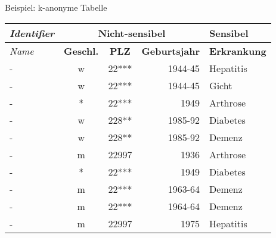 \begin{frame}{Beispiel: k-anonyme Tabelle}
	\begin{center}
		\begin{tabular}{|l|c|c|r|l|}
		\hline \textit{Identifier} & \multicolumn{3}{c|}{\textbf{Nicht-sensibel}} & \textbf{Sensibel} \\ 
		\hline \textit{Name} & \textbf{Geschl.} & \textbf{PLZ} & \textbf{Geburtsjahr} & \textbf{Erkrankung} \\ \hline
		\hline \rowcolor{svshellblau1!30} - & w & 22*** & 1944-45 & Hepatitis \\ 
		\hline \rowcolor{svshellblau1!30} - & w & 22*** & 1944-45 & Gicht \\
		\hline \rowcolor{svsgrau1!30} - & * & 22*** & 1949 & Arthrose \\ 
		\hline \rowcolor{svshellblau2!30} - & w & 228** & 1985-92 & Diabetes \\ 
		\hline \rowcolor{svshellblau2!30} - & w & 228** & 1985-92 & Demenz \\  
		\hline - & m & 22997 & 1936 & Arthrose \\ 
		\hline \rowcolor{svsgrau1!30}- & * & 22*** & 1949 & Diabetes \\ 
		\hline \rowcolor{svsrot!30} - & m & 22*** & 1963-64 & Demenz \\ 
		\hline \rowcolor{svsrot!30} - & m & 22*** & 1964-64 & Demenz \\ 
		\hline - & m & 22997 & 1975 & Hepatitis \\ 
		\hline 
		\end{tabular}
	\end{center}
\end{frame}

